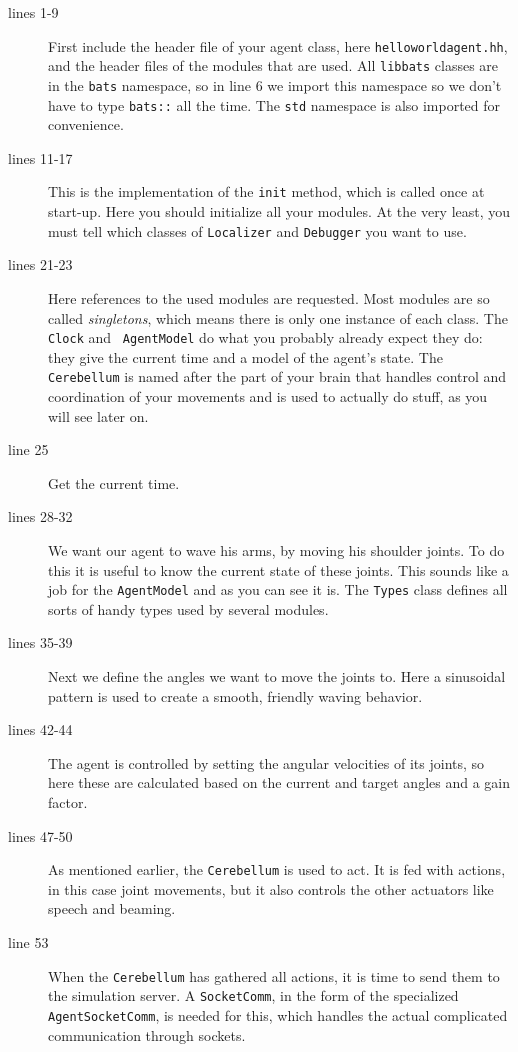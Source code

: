 \begin{description}
\item[lines 1-9] First include the header file of your agent class,
  here {\tt helloworldagent.hh}, and the header files of the modules
  that are used. All {\tt libbats} classes are in the {\tt bats}
  namespace, so in line 6 we import this namespace so we don't have to
  type {\tt bats::} all the time. The {\tt std} namespace is also
  imported for convenience.
\item[lines 11-17] This is the implementation of the {\tt init}
  method, which is called once at start-up. Here you should initialize
  all your modules. At the very least, you must tell {\libbats} which
  classes of {\tt Localizer} and {\tt Debugger} you want to use.
\item[lines 21-23] Here references to the used modules are
  requested. Most modules are so called \emph{singletons}, which means
  there is only one instance of each class. The {\tt Clock} and {\tt
    AgentModel} do what you probably already expect they do: they give
  the current time and a model of the agent's state. The {\tt
    Cerebellum} is named after the part of your brain that handles
  control and coordination of your movements and is used to actually
  do stuff, as you will see later on.
\item[line 25] Get the current time.
\item[lines 28-32] We want our agent to wave his arms, by moving his
  shoulder joints. To do this it is useful to know the current state
  of these joints. This sounds like a job for the {\tt AgentModel} and
  as you can see it is. The {\tt Types} class defines all sorts of
  handy types used by several modules.
\item[lines 35-39] Next we define the angles we want to move the
  joints to. Here a sinusoidal pattern is used to create a smooth,
  friendly waving behavior.
\item[lines 42-44] The agent is controlled by setting the angular
  velocities of its joints, so here these are calculated based on the
  current and target angles and a gain factor.
\item[lines 47-50] As mentioned earlier, the {\tt Cerebellum} is used
  to act. It is fed with actions, in this case joint movements, but it
  also controls the other actuators like speech and beaming.
\item[line 53] When the {\tt Cerebellum} has gathered all actions, it
  is time to send them to the simulation server. A {\tt SocketComm},
  in the form of the specialized {\tt AgentSocketComm}, is needed for
  this, which handles the actual complicated communication through
  sockets.
\end{description}

